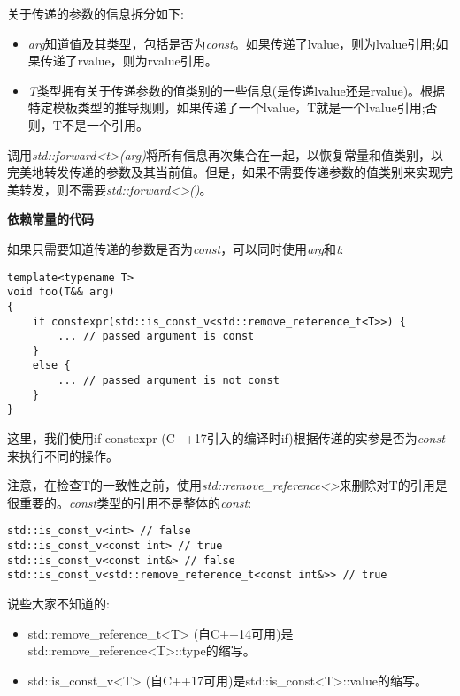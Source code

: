 关于传递的参数的信息拆分如下:\par

\begin{itemize}
	\item \textit{arg}知道值及其类型，包括是否为\textit{const}。如果传递了lvalue，则为lvalue引用;如果传递了rvalue，则为rvalue引用。
	\item \textit{T}类型拥有关于传递参数的值类别的一些信息(是传递lvalue还是rvalue)。根据特定模板类型的推导规则，如果传递了一个lvalue，T就是一个lvalue引用;否则，T不是一个引用。
\end{itemize}

调用\textit{std::forward<t>(arg)}将所有信息再次集合在一起，以恢复常量和值类别，以完美地转发传递的参数及其当前值。但是，如果不需要传递参数的值类别来实现完美转发，则不需要\textit{std::forward<>()}。\par

\hspace*{\fill} \par %
\textbf{依赖常量的代码}

如果只需要知道传递的参数是否为\textit{const}，可以同时使用\textit{arg}和\textit{t}:\par

\begin{lstlisting}[caption={}]
template<typename T>
void foo(T&& arg)
{
	if constexpr(std::is_const_v<std::remove_reference_t<T>>) {
		... // passed argument is const
	}
	else {
		... // passed argument is not const
	}
}
\end{lstlisting}

这里，我们使用if constexpr (C++17引入的编译时if)根据传递的实参是否为\textit{const}来执行不同的操作。\par

注意，在检查T的一致性之前，使用\textit{std::remove\_reference<>}来删除对T的引用是很重要的。\textit{const}类型的引用不是整体的\textit{const}:\par

\begin{lstlisting}[caption={}]
std::is_const_v<int> // false
std::is_const_v<const int> // true
std::is_const_v<const int&> // false
std::is_const_v<std::remove_reference_t<const int&>> // true
\end{lstlisting}

说些大家不知道的:\par

\begin{itemize}
	\item std::remove\_reference\_t<T> (自C++14可用)是std::remove\_reference<T>::type的缩写。
	\item std::is\_const\_v<T> (自C++17可用)是std::is\_const<T>::value的缩写。
\end{itemize}

